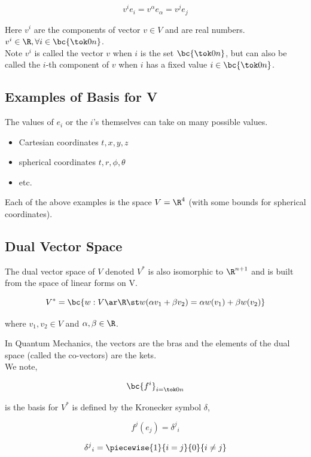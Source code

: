 \documentclass{article}
\begin{document}
\[ v^ie_i = v^{\alpha}e_{\alpha} = v^je_j \]

Here $v^i$ are the components of vector $v \in V$ and are real numbers. $v^i \in \R, \forall i \in \bc{\tok0n}$. \\

Note $v^i$ is called the vector $v$ when $i$ is the set $\bc{\tok0n}$, but can also be called the $i$-th component of $v$ when $i$ has a fixed value $i \in \bc{\tok0n}$. \\

\subsection{Examples of Basis for V}

The values of $e_i$ or the $i$'s themselves can take on many possible values.

\begin{itemize}
    \item Cartesian coordinates $t,x,y,z$
    \item spherical coordinates $t, r, \phi, \theta$
    \item etc.
\end{itemize}

Each of the above examples is the space $V = \R^4$ (with some bounds for spherical coordinates).

\subsection{Dual Vector Space}

The dual vector space of $V$ denoted $V^*$ is also isomorphic to $\R^{n+1}$ and is built from the space of linear forms on V.

\[ V^* = \bc{w: V \ar \R \st w(\alpha v_1 + \beta v_2) = \alpha w( v_1) + \beta w(v_2)} \]

where $v_1, v_2 \in V$ and $\alpha, \beta \in \R$.

In Quantum Mechanics, the vectors are the bras and the elements of the dual space (called the co-vectors) are the kets. \\

We note,

\[ \bc{f^i}_{i=\tok0n} \]

is the basis for $V^*$ is defined by the Kronecker symbol $\delta$,

\[ f^j(e_j) = {\delta^j}_i \]

\[ {\delta^j}_i = \piecewise{1}{i=j}{0}{i\neq j} \]
\end{document}
